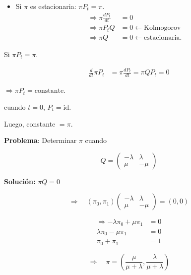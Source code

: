 \documentclass[12pt,a4paper]{article}
\begin{document}
\begin{itemize}
\item Si $\pi$ es estacionaria: $\pi P_t = \pi$.
\begin{align*}
\Rightarrow \pi \frac{dP_t}{dt} &= 0 \\
\Rightarrow \pi P_t Q &= 0 \leftarrow \text{Kolmogorov} \\
\Rightarrow \pi Q &= 0 \leftarrow \text{estacionaria}.
\end{align*}
\end{itemize}

Si $\pi P_t = \pi$.

\begin{align*}
\frac{d}{dt} \pi P_t &= \pi \frac{dP_t}{dt} = \pi Q P_t = 0
\end{align*}

$\Rightarrow \pi P_t = \text{constante}$.

cuando $t = 0$, $P_t = \text{id}$.

Luego, constante $= \pi$.


\textbf{Problema}: Determinar $\pi$ cuando

\begin{equation*}
Q = \begin{pmatrix}
-\lambda & \lambda \\
\mu & -\mu
\end{pmatrix}
\end{equation*}

\textbf{Solución:} $\pi Q = 0$

\begin{equation*}
\Rightarrow \quad (\pi_0, \pi_1) \begin{pmatrix}
-\lambda & \lambda \\
\mu & -\mu
\end{pmatrix} = (0, 0)
\end{equation*}

\begin{align*}
\Rightarrow -\lambda \pi_0 + \mu \pi_1 &= 0 \\
\lambda \pi_0 - \mu \pi_1 &= 0 \\
\pi_0 + \pi_1 &= 1
\end{align*}

\begin{equation*}
\Rightarrow \quad \pi = \left(\frac{\mu}{\mu + \lambda}, \frac{\lambda}{\mu + \lambda}\right)
\end{equation*}
\end{document}
